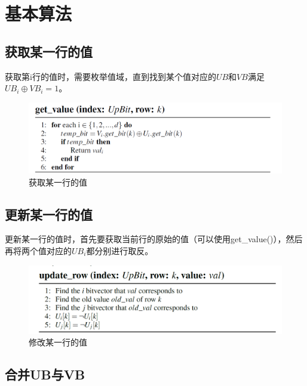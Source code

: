 \documentclass[11pt, a4paper]{article}
\begin{document}
  \section{基本算法}

  \subsection{获取某一行的值}

  获取第i行的值时，需要枚举值域，直到找到某个值对应的$UB$和$VB$满足$UB_i \oplus VB_i = 1$。

  \begin{figure}[H]
    \begin{center}
      \includegraphics[width=5in]{img/get_value.png}
      \caption{获取某一行的值}
      \label{fig:get_value}
    \end{center}
  \end{figure}

  \subsection{更新某一行的值}

  更新某一行的值时，首先要获取当前行的原始的值（可以使用get\_value()），然后再将两个值对应的$UB_i$都分别进行取反。


  \begin{figure}[H]
    \begin{center}
      \includegraphics[width=5in]{img/update_row.png}
      \caption{修改某一行的值}
      \label{fig:update_row}
    \end{center}
  \end{figure}

  \subsection{合并UB与VB}
\end{document}
